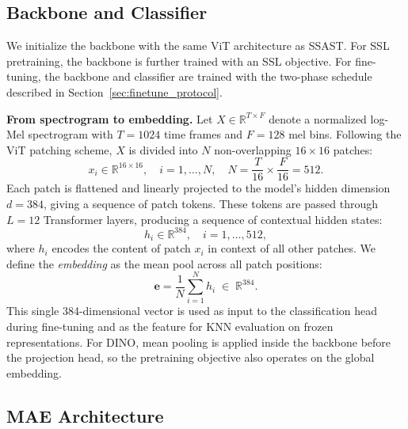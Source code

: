 \documentclass{article}
\begin{document}
\subsection{Backbone and Classifier}

We initialize the backbone with the same ViT architecture as SSAST. For SSL pretraining, the backbone is further trained with an SSL objective. For fine-tuning, the backbone and classifier are trained with the two-phase schedule described in Section~\ref{sec:finetune_protocol}.

\noindent\textbf{From spectrogram to embedding.}
Let $X \in \mathbb{R}^{T \times F}$ denote a normalized log-Mel spectrogram with $T{=}1024$ time frames and $F{=}128$ mel bins. Following the ViT patching scheme, $X$ is divided into $N$ non-overlapping $16{\times}16$ patches:
\[
    x_i \in \mathbb{R}^{16 \times 16}, \quad i = 1, \ldots, N, \quad N = \frac{T}{16} \times \frac{F}{16} = 512.
\]
Each patch is flattened and linearly projected to the model's hidden dimension $d{=}384$, giving a sequence of patch tokens. These tokens are passed through $L{=}12$ Transformer layers, producing a sequence of contextual hidden states:
\[
    h_i \in \mathbb{R}^{384}, \quad i = 1, \ldots, 512,
\]
where $h_i$ encodes the content of patch $x_i$ in context of all other patches. We define the \emph{embedding} as the mean pool across all patch positions:
\[
    \mathbf{e} = \frac{1}{N}\sum_{i=1}^{N} h_i \;\in\; \mathbb{R}^{384}.
\]
This single 384-dimensional vector is used as input to the classification head during fine-tuning and as the feature for KNN evaluation on frozen representations. For DINO, mean pooling is applied inside the backbone before the projection head, so the pretraining objective also operates on the global embedding.

\subsection{MAE Architecture}
\end{document}
